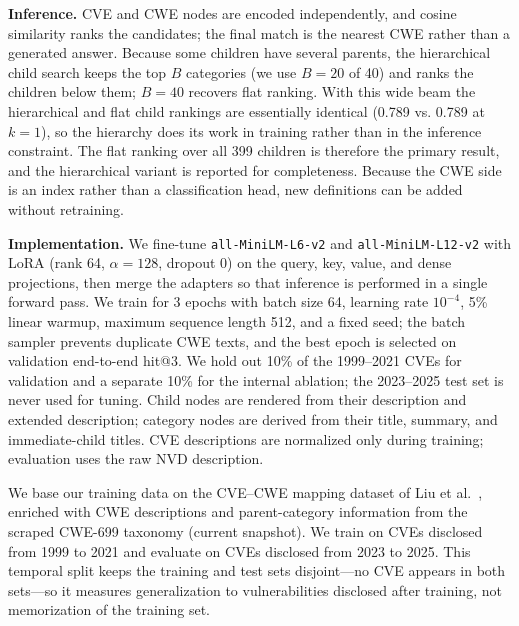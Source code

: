 \documentclass[conference,compsoc]{IEEEtran}
\begin{document}
\textbf{Inference.} CVE and CWE nodes are encoded independently, and cosine similarity ranks the candidates; the final match is the nearest CWE rather than a generated answer. Because some children have several parents, the hierarchical child search keeps the top \(B\) categories (we use \(B=20\) of 40) and ranks the children below them; \(B=40\) recovers flat ranking. With this wide beam the hierarchical and flat child rankings are essentially identical (0.789 vs. 0.789 at \(k=1\)), so the hierarchy does its work in training rather than in the inference constraint. The flat ranking over all 399 children is therefore the primary result, and the hierarchical variant is reported for completeness. Because the CWE side is an index rather than a classification head, new definitions can be added without retraining.

\textbf{Implementation.} We fine-tune \texttt{all-MiniLM-L6-v2} and \texttt{all-MiniLM-L12-v2} with LoRA (rank 64, \(\alpha=128\), dropout 0) on the query, key, value, and dense projections, then merge the adapters so that inference is performed in a single forward pass. We train for 3 epochs with batch size 64, learning rate \(10^{-4}\), 5\% linear warmup, maximum sequence length 512, and a fixed seed; the batch sampler prevents duplicate CWE texts, and the best epoch is selected on validation end-to-end hit@3. We hold out 10\% of the 1999--2021 CVEs for validation and a separate 10\% for the internal ablation; the 2023--2025 test set is never used for tuning. Child nodes are rendered from their description and extended description; category nodes are derived from their title, summary, and immediate-child titles. CVE descriptions are normalized only during training; evaluation uses the raw NVD description.

We base our training data on the CVE--CWE mapping dataset of Liu et al.~\cite{liu2024cvecwedataset}, enriched with CWE descriptions and parent-category information from the scraped CWE-699 taxonomy (current snapshot). We train on CVEs disclosed from 1999 to 2021 and evaluate on CVEs disclosed from 2023 to 2025. This temporal split keeps the training and test  sets disjoint---no CVE appears in both sets---so it measures generalization to vulnerabilities disclosed after training, not memorization of the training set.
\end{document}
